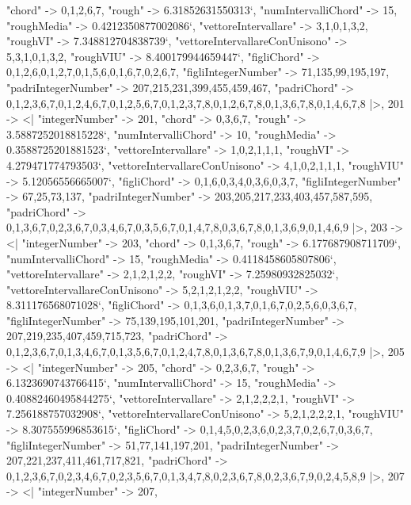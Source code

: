 \documentclass[
]{article}
\begin{document}
\begin{DatasetVerbatim}
    "chord" -> {0,1,2,6,7},
    "rough" -> 6.31852631550313`,
    "numIntervalliChord" -> 15,
    "roughMedia" -> 0.4212350877002086`,
    "vettoreIntervallare" -> {3,1,0,1,3,2},
    "roughVI" -> 7.348812704838739`,
    "vettoreIntervallareConUnisono" -> {5,3,1,0,1,3,2},
    "roughVIU" -> 8.400179944659447`,
    "figliChord" -> {{0,1,2,6},{0,1,2,7},{0,1,5,6},{0,1,6,7},{0,2,6,7}},
    "figliIntegerNumber" -> {71,135,99,195,197},
    "padriIntegerNumber" -> {207,215,231,399,455,459,467},
    "padriChord" -> {{0,1,2,3,6,7},{0,1,2,4,6,7},{0,1,2,5,6,7},{0,1,2,3,7,8},{0,1,2,6,7,8},{0,1,3,6,7,8},{0,1,4,6,7,8}}
  |>,
  201 -> <|
    "integerNumber" -> 201,
    "chord" -> {0,3,6,7},
    "rough" -> 3.5887252018815228`,
    "numIntervalliChord" -> 10,
    "roughMedia" -> 0.3588725201881523`,
    "vettoreIntervallare" -> {1,0,2,1,1,1},
    "roughVI" -> 4.279471774793503`,
    "vettoreIntervallareConUnisono" -> {4,1,0,2,1,1,1},
    "roughVIU" -> 5.12056556665007`,
    "figliChord" -> {{0,1,6},{0,3,4},{0,3,6},{0,3,7}},
    "figliIntegerNumber" -> {67,25,73,137},
    "padriIntegerNumber" -> {203,205,217,233,403,457,587,595},
    "padriChord" -> {{0,1,3,6,7},{0,2,3,6,7},{0,3,4,6,7},{0,3,5,6,7},{0,1,4,7,8},{0,3,6,7,8},{0,1,3,6,9},{0,1,4,6,9}}
  |>,
  203 -> <|
    "integerNumber" -> 203,
    "chord" -> {0,1,3,6,7},
    "rough" -> 6.177687908711709`,
    "numIntervalliChord" -> 15,
    "roughMedia" -> 0.4118458605807806`,
    "vettoreIntervallare" -> {2,1,2,1,2,2},
    "roughVI" -> 7.25980932825032`,
    "vettoreIntervallareConUnisono" -> {5,2,1,2,1,2,2},
    "roughVIU" -> 8.311176568071028`,
    "figliChord" -> {{0,1,3,6},{0,1,3,7},{0,1,6,7},{0,2,5,6},{0,3,6,7}},
    "figliIntegerNumber" -> {75,139,195,101,201},
    "padriIntegerNumber" -> {207,219,235,407,459,715,723},
    "padriChord" -> {{0,1,2,3,6,7},{0,1,3,4,6,7},{0,1,3,5,6,7},{0,1,2,4,7,8},{0,1,3,6,7,8},{0,1,3,6,7,9},{0,1,4,6,7,9}}
  |>,
  205 -> <|
    "integerNumber" -> 205,
    "chord" -> {0,2,3,6,7},
    "rough" -> 6.1323690743766415`,
    "numIntervalliChord" -> 15,
    "roughMedia" -> 0.40882460495844275`,
    "vettoreIntervallare" -> {2,1,2,2,2,1},
    "roughVI" -> 7.256188757032908`,
    "vettoreIntervallareConUnisono" -> {5,2,1,2,2,2,1},
    "roughVIU" -> 8.307555996853615`,
    "figliChord" -> {{0,1,4,5},{0,2,3,6},{0,2,3,7},{0,2,6,7},{0,3,6,7}},
    "figliIntegerNumber" -> {51,77,141,197,201},
    "padriIntegerNumber" -> {207,221,237,411,461,717,821},
    "padriChord" -> {{0,1,2,3,6,7},{0,2,3,4,6,7},{0,2,3,5,6,7},{0,1,3,4,7,8},{0,2,3,6,7,8},{0,2,3,6,7,9},{0,2,4,5,8,9}}
  |>,
  207 -> <|
    "integerNumber" -> 207,

\end{DatasetVerbatim}
\end{document}
